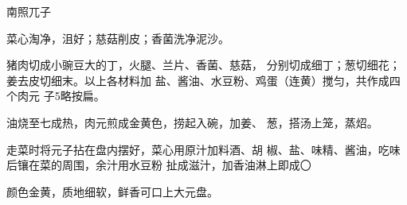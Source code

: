\begin{recipe}{南照兀子}

\ingredients





\cooking

\step 菜心淘净，沮好；慈菇削皮；香菌洗净泥沙。

\step 猪肉切成小豌豆大的丁，火腿、兰片、香菌、慈菇， 分别切成细丁；葱切细花；姜去皮切细末。以上各材料加 盐、酱油、水豆粉、鸡蛋（连黄）搅匀，共作成四个肉元 子5略按扁。

\step 油烧至七成热，肉元煎成金黄色，捞起入碗，加姜、 葱，搭汤上笼，蒸炤。

\step 走菜时将元子拈在盘内摆好，菜心用原汁加料酒、胡 椒、盐、味精、酱油，吃味后镶在菜的周围，余汁用水豆粉 扯成滋汁，加香油淋上即成〇

\notes

颜色金黄，质地细软，鲜香可口上大元盘。

\end{recipe}

